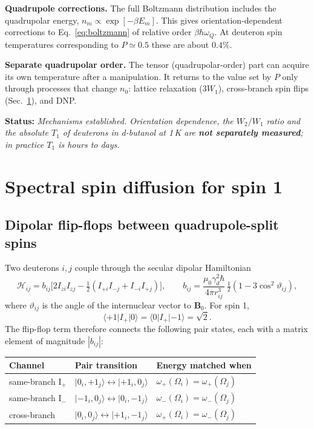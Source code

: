 \documentclass[11pt]{article}
\newcommand{\ket}[1]{\lvert #1\rangle}
\newcommand{\bra}[1]{\langle #1\rvert}
\newcommand{\status}[1]{\par\noindent\textbf{\textsf{Status:}} \emph{#1}\par}
\begin{document}
\textbf{Quadrupole corrections.} The full Boltzmann distribution includes the quadrupolar
energy, $n_m\propto\exp[-\beta E_m]$. This gives orientation-dependent corrections to
Eq.~\eqref{eq:boltzmann} of relative order $\beta\hbar\omega_Q$. At deuteron spin temperatures
corresponding to $P\simeq0.5$ these are about $0.4\%$.

\textbf{Separate quadrupolar order.} The tensor (quadrupolar-order) part can acquire its own
temperature after a manipulation. It returns to the value set by $P$ only through processes
that change $n_0$: lattice relaxation ($3W_1$), cross-branch spin flips
(Sec.~\ref{sec:diffusion}), and DNP.

\status{Mechanisms established. Orientation dependence, the $W_2/W_1$ ratio and the absolute
$T_1$ of deuterons in d-butanol at 1\,K are \textbf{not separately measured}; in practice
$T_1$ is hours to days.}

\section{Spectral spin diffusion for spin 1}
\label{sec:diffusion}

\subsection{Dipolar flip-flops between quadrupole-split spins}
Two deuterons $i,j$ couple through the secular dipolar Hamiltonian
\cite{Abragam1961,Bloembergen1949}
\[
\mathcal H_{ij}=b_{ij}\big[2I_{zi}I_{zj}-\tfrac12(I_{+i}I_{-j}+I_{-i}I_{+j})\big],\qquad
b_{ij}=\frac{\mu_0\gamma_d^2\hbar}{4\pi r_{ij}^3}\,\tfrac12(1-3\cos^2\vartheta_{ij}),
\]
where $\vartheta_{ij}$ is the angle of the internuclear vector to $\mathbf B_0$. For spin 1,
\[
\bra{+1}I_+\ket{0}=\bra{0}I_+\ket{-1}=\sqrt2 .
\]
The flip-flop term therefore connects the following pair states, each with a matrix element of
magnitude $|b_{ij}|$:

\begin{center}
\begin{tabular}{@{}lll@{}}
\toprule
Channel & Pair transition & Energy matched when \\
\midrule
same-branch I$_+$ & $\ket{0_i,{+1}_j}\leftrightarrow\ket{{+1}_i,0_j}$ & $\omega_+(\Omega_i)=\omega_+(\Omega_j)$\\
same-branch I$_-$ & $\ket{{-1}_i,0_j}\leftrightarrow\ket{0_i,{-1}_j}$ & $\omega_-(\Omega_i)=\omega_-(\Omega_j)$\\
cross-branch & $\ket{0_i,0_j}\leftrightarrow\ket{{+1}_i,{-1}_j}$ & $\omega_+(\Omega_i)=\omega_-(\Omega_j)$\\
\bottomrule
\end{tabular}
\end{center}
\end{document}
